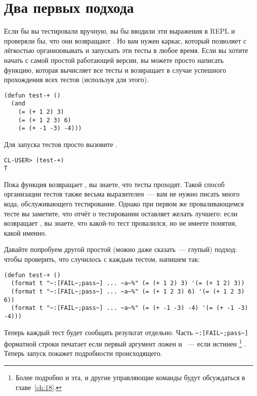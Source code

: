 \section{Два первых подхода}

Если бы вы тестировали вручную, вы бы вводили эти выражения в REPL и проверяли бы, что они
возвращают . Но вам нужен каркас, который позволяет с лёгкостью организовывать и
запускать эти тесты в любое время. Если вы хотите начать с самой простой работающей
версии, вы можете просто написать функцию, которая вычисляет все тесты и возвращает
 в случае успешного прохождения всех тестов (используя  для этого).

\begin{lstlisting}
(defun test-+ ()
  (and
    (= (+ 1 2) 3)
    (= (+ 1 2 3) 6)
    (= (+ -1 -3) -4)))
\end{lstlisting}

Для запуска тестов просто вызовите .

\begin{lstlisting}
CL-USER> (test-+)
T
\end{lstlisting}

Пока функция возвращает , вы знаете, что тесты проходят. Такой способ организации
тестов также весьма выразителен~--- вам не нужно писать много кода, обслуживающего
тестирование. Однако при первом же проваливающемся тесте вы заметите, что отчёт о
тестировании оставляет желать лучшего: если  возвращает , вы
знаете, что какой-то тест провалился, но не имеете понятия, какой именно.

Давайте попробуем другой простой (можно даже сказать~--- глупый) подход: чтобы проверить,
что случилось с каждым тестом, напишем так:

\begin{lstlisting}
(defun test-+ ()
  (format t "~:[FAIL~;pass~] ... ~a~%" (= (+ 1 2) 3) '(= (+ 1 2) 3))
  (format t "~:[FAIL~;pass~] ... ~a~%" (= (+ 1 2 3) 6) '(= (+ 1 2 3) 6))
  (format t "~:[FAIL~;pass~] ... ~a~%" (= (+ -1 -3) -4) '(= (+ -1 -3) -4)))
\end{lstlisting}

Теперь каждый тест будет сообщать результат отдельно. Часть \lstinline!~:[FAIL~;pass~]!
форматной строки  печатает  если первый аргумент ложен и
~--- если истинен \footnote{Более подробно и эта, и другие управляющие команды
   будут обсуждаться в главе~\ref{ch:18}.} . Теперь запуск 
покажет подробности происходящего.

